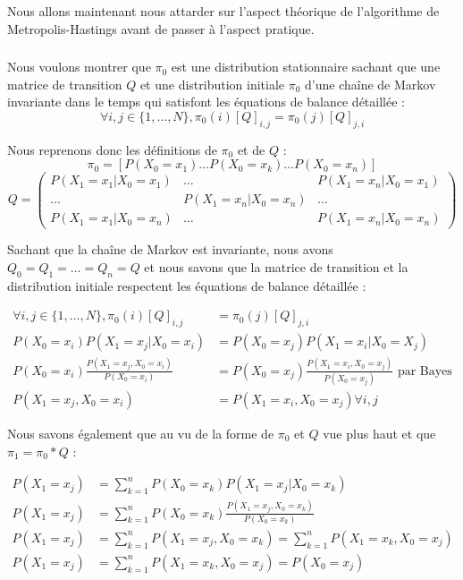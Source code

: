 Nous allons maintenant nous attarder sur l'aspect théorique de l'algorithme de 
Metropolis-Hastings avant de passer à l'aspect pratique.

\subsubsection{}
Nous voulons montrer que $\pi_0$ est une distribution stationnaire sachant que une matrice de transition $Q$ et une distribution initiale $\pi_0$ 
d'une chaîne de Markov invariante dans le temps qui satisfont les équations de balance détaillée :
\begin{equation*}
  \forall i,j \in \{ 1,\dots,N \}, \pi_0(i)[Q]_{i,j} = \pi_0(j)[Q]_{j,i}
\end{equation*}

Nous reprenons donc les définitions de $\pi_0$ et de $Q$ :
\begin{equation*}
  \pi_0 = [P(X_0=x_1) \dots P(X_0=x_k) \dots P(X_0=x_n)]
\end{equation*}
$$Q = \begin{pmatrix}
  P(X_1 = x_1|X_0=x_1) & \dots & P(X_1 = x_n|X_0=x_1)\\
  \dots & P(X_1 = x_n|X_0=x_n) & \dots\\
  P(X_1 = x_1|X_0=x_n) & \dots & P(X_1 = x_n|X_0=x_n)
\end{pmatrix}$$

Sachant que la chaîne de Markov est invariante, nous avons $Q_0 = Q_1 = \dots = Q_n = Q$ et nous savons que la matrice de transition et la distribution initiale respectent les équations de balance détaillée :

\begin{align*}
  \forall i,j \in \{ 1,\dots,N \}, \pi_0(i)[Q]_{i,j} &= \pi_0(j)[Q]_{j,i}\\
  P(X_0=x_i)P(X_1=x_j|X_0=x_i) &= P(X_0 = x_j)P(X_1=x_i|X_0=X_j)\\
  P(X_0=x_i)\frac{P(X_1=x_j,X_0=x_i)}{P(X_0=x_i)} &= P(X_0=x_j)\frac{P(X_1=x_i,X_0=x_j)}{P(X_0=x_j)} \text{ par Bayes}\\
  P(X_1=x_j,X_0=x_i) &= P(X_1=x_i,X_0=x_j) \forall i,j
\end{align*}

Nous savons également que au vu de la forme de $\pi_0$ et $Q$ vue plus haut et que $\pi_1 = \pi_0 * Q$ :

\begin{align*}
  P(X_1=x_j) &= \sum_{k=1}^n P(X_0=x_k)P(X_1=x_j|X_0=x_k)\\
  P(X_1=x_j) &= \sum_{k=1}^n P(X_0=x_k)\frac{P(X_1=x_j,X_0=x_k)}{P(X_0=x_k)}\\
  P(X_1=x_j) &= \sum_{k=1}^n P(X_1=x_j,X_0=x_k) = \sum_{k=1}^n P(X_1=x_k,X_0=x_j)\\
  P(X_1=x_j) &= \sum_{k=1}^n P(X_1=x_k,X_0=x_j) = P(X_0=x_j)
\end{align*}

